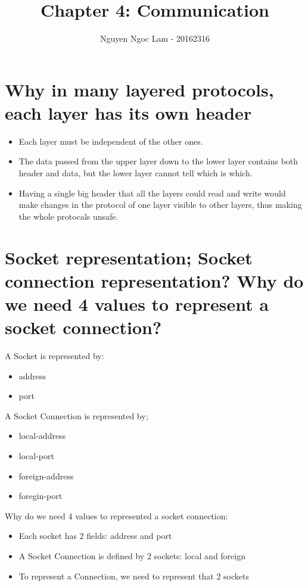 \documentclass[11pt,a4paper]{article}
\title{Chapter 4: Communication}
\date{\displaydate{date}}
\author{Nguyen Ngoc Lam - 20162316}
\begin{document}
  	\maketitle
  	\newpage
  	\tableofcontents
  	\newpage
  	
  	\section{Why in many layered protocols, each layer has its own header}
  	\begin{itemize}
  		\item Each layer must be independent of the other ones.
  		\item The data passed from the upper layer down to the lower layer contains both header and data, but the lower layer cannot tell which is which.
  		\item Having a single big header that all the layers could read
and write would make changes in the protocol of one layer visible to other layers, thus making the whole protocals unsafe.
  	\end{itemize}
  	
  	\section{Socket representation; Socket connection representation? Why do we need 4 values to represent a socket connection?}
  	A Socket is represented by:
  	\begin{itemize}
  		\item address
  		\item port
  	\end{itemize}
  	A Socket Connection is represented by;
  	\begin{itemize}
  		\item local-address
  		\item local-port
  		\item foreign-address
  		\item foregin-port
  	\end{itemize}
  	Why do we need 4 values to represented a socket connection:
  	\begin{itemize}
  		\item Each socket has 2 fields: address and port
  		\item A Socket Connection is defined by 2 sockets: local and foreign
  		\item To represent a Connection, we need to represent that 2 sockets
  	\end{itemize}
  	
\end{document}

